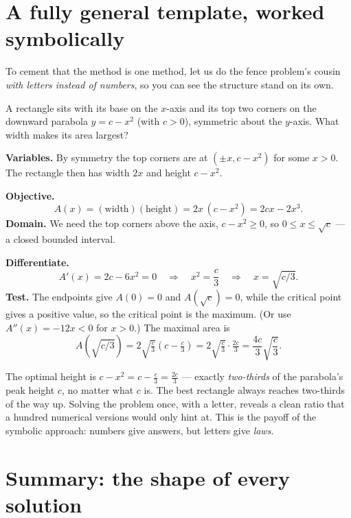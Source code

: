 \section{A fully general template, worked symbolically}

To cement that the method is one method, let us do the fence problem's cousin
\emph{with letters instead of numbers}, so you can see the structure stand on its own.

\begin{example}\label{ch17:ex-inscribed}
A rectangle sits with its base on the $x$-axis and its top two corners on the
downward parabola $y = c - x^2$ (with $c>0$), symmetric about the $y$-axis. What width
makes its area largest?
\end{example}

\textbf{Variables.} By symmetry the top corners are at $(\pm x, c - x^2)$ for some
$x>0$. The rectangle then has width $2x$ and height $c - x^2$.

\textbf{Objective.}
\[
A(x) = (\text{width})(\text{height}) = 2x\,(c - x^2) = 2cx - 2x^3.
\]
\textbf{Domain.} We need the top corners above the axis, $c - x^2 \ge 0$, so
$0 \le x \le \sqrt{c}$ --- a closed bounded interval.

\textbf{Differentiate.}
\[
A'(x) = 2c - 6x^2 = 0 \quad\Longrightarrow\quad x^2 = \frac{c}{3}
\quad\Longrightarrow\quad x = \sqrt{c/3}.
\]
\textbf{Test.} The endpoints give $A(0)=0$ and $A(\sqrt c)=0$, while the critical
point gives a positive value, so the critical point is the maximum. (Or use
$A''(x)=-12x<0$ for $x>0$.) The maximal area is
\[
A\!\left(\sqrt{c/3}\right) = 2\sqrt{\tfrac{c}{3}}\left(c - \tfrac{c}{3}\right)
= 2\sqrt{\tfrac{c}{3}}\cdot \tfrac{2c}{3}
= \frac{4c}{3}\sqrt{\frac{c}{3}}.
\]

\begin{aestheticbox}
The optimal height is $c - x^2 = c - \tfrac{c}{3} = \tfrac{2c}{3}$ --- exactly
\emph{two-thirds} of the parabola's peak height $c$, no matter what $c$ is. The best
rectangle always reaches two-thirds of the way up. Solving the problem once, with a
letter, reveals a clean ratio that a hundred numerical versions would only hint at.
This is the payoff of the symbolic approach: numbers give answers, but letters give
\emph{laws}.
\end{aestheticbox}

\section{Summary: the shape of every solution}

